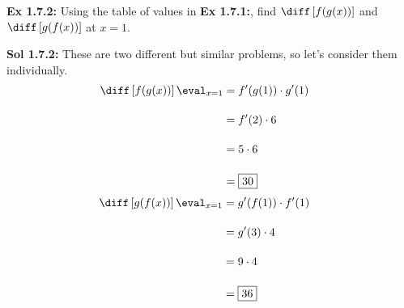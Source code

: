 \begin{tcolorbox}[example]
    \textbf{Ex 1.7.2: } Using the table of values in \textbf{Ex 1.7.1:}, find $\diff \left[f(g(x))\right]$ and $\diff \left[g(f(x))\right]$ at $x = 1$. 
\end{tcolorbox}
\begin{tcolorbox}[solution]
    \textbf{Sol 1.7.2: } These are two different but similar problems, so let's consider them individually. \begin{align*}
        & \diff \left[f(g(x))\right] \eval_{x = 1} \begin{aligned}[t]
            & = f'(g(1)) \cdot g'(1) \\[11pt]
            & = f'(2) \cdot 6 \\[11pt]
            & = 5 \cdot 6 \\[11pt]
            & = \boxed{30}
        \end{aligned}
    \end{align*} \begin{align*}
        & \diff \left[g(f(x))\right] \eval_{x = 1} \begin{aligned}[t]
            & = g'(f(1)) \cdot f'(1) \\[11pt]
            & = g'(3) \cdot 4 \\[11pt]
            & = 9 \cdot 4 \\[11pt]
            & = \boxed{36}
        \end{aligned}
    \end{align*}
\end{tcolorbox} \vspace{11pt}

